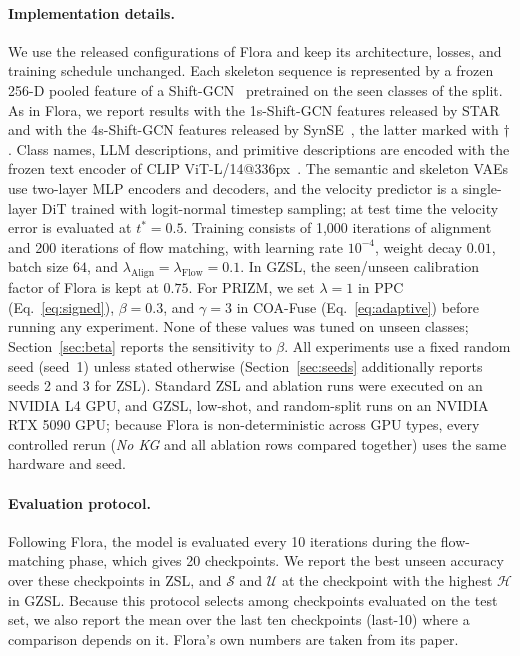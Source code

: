 \documentclass[11pt]{article}
\begin{document}
\paragraph{Implementation details.}
We use the released configurations of Flora and keep its architecture, losses, and training schedule unchanged. Each skeleton sequence is represented by a frozen 256-D pooled feature of a Shift-GCN~\cite{shiftgcn} pretrained on the seen classes of the split. As in Flora, we report results with the 1s-Shift-GCN features released by STAR~\cite{star24} and with the 4s-Shift-GCN features released by SynSE~\cite{synse21}, the latter marked with $\dagger$. Class names, LLM descriptions, and primitive descriptions are encoded with the frozen text encoder of CLIP ViT-L/14@336px~\cite{clip21}. The semantic and skeleton VAEs use two-layer MLP encoders and decoders, and the velocity predictor is a single-layer DiT trained with logit-normal timestep sampling; at test time the velocity error is evaluated at $t^\ast = 0.5$. Training consists of 1,000 iterations of alignment and 200 iterations of flow matching, with learning rate $10^{-4}$, weight decay $0.01$, batch size $64$, and $\lambda_{\text{Align}} = \lambda_{\text{Flow}} = 0.1$. In GZSL, the seen/unseen calibration factor of Flora is kept at $0.75$. For PRIZM, we set $\lambda = 1$ in PPC (Eq.~\eqref{eq:signed}), $\beta = 0.3$, and $\gamma = 3$ in COA-Fuse (Eq.~\eqref{eq:adaptive}) before running any experiment. None of these values was tuned on unseen classes; Section~\ref{sec:beta} reports the sensitivity to $\beta$. All experiments use a fixed random seed (seed~1) unless stated otherwise (Section~\ref{sec:seeds} additionally reports seeds 2 and 3 for ZSL). Standard ZSL and ablation runs were executed on an NVIDIA L4 GPU, and GZSL, low-shot, and random-split runs on an NVIDIA RTX 5090 GPU; because Flora is non-deterministic across GPU types, every controlled rerun (\emph{No KG} and all ablation rows compared together) uses the same hardware and seed.

\paragraph{Evaluation protocol.}
Following Flora, the model is evaluated every 10 iterations during the flow-matching phase, which gives 20 checkpoints. We report the best unseen accuracy over these checkpoints in ZSL, and $\mathcal{S}$ and $\mathcal{U}$ at the checkpoint with the highest $\mathcal{H}$ in GZSL. Because this protocol selects among checkpoints evaluated on the test set, we also report the mean over the last ten checkpoints (last-10) where a comparison depends on it. Flora's own numbers are taken from its paper.
\end{document}
